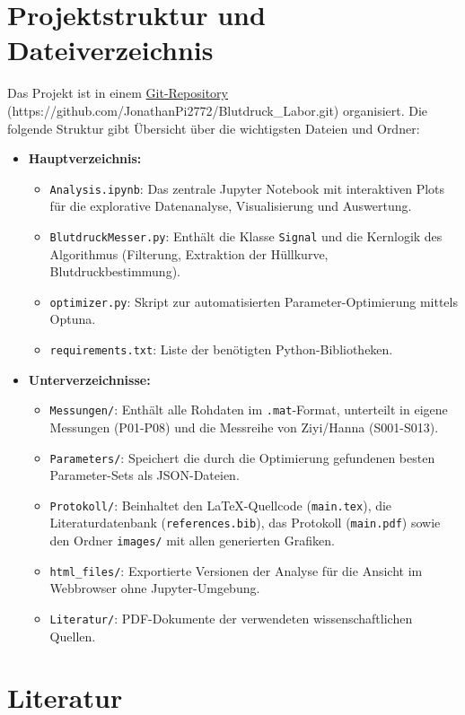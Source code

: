 \documentclass[a4paper, 11pt]{scrartcl}
\begin{document}
\newpage

\section{Projektstruktur und Dateiverzeichnis}

Das Projekt ist in einem \href{https://github.com/JonathanPi2772/Blutdruck_Labor.git}{Git-Repository} (https://github.com/JonathanPi2772/Blutdruck\_Labor.git) organisiert. Die folgende Struktur gibt Übersicht über die wichtigsten Dateien und Ordner:

\begin{itemize}
    \item \textbf{Hauptverzeichnis:}
    \begin{itemize}
        \item \texttt{Analysis.ipynb}: Das zentrale Jupyter Notebook mit interaktiven Plots für die explorative Datenanalyse, Visualisierung und Auswertung.
        \item \texttt{BlutdruckMesser.py}: Enthält die Klasse \texttt{Signal} und die Kernlogik des Algorithmus (Filterung, Extraktion der Hüllkurve, Blutdruckbestimmung).
        \item \texttt{optimizer.py}: Skript zur automatisierten Parameter-Optimierung mittels Optuna.
        \item \texttt{requirements.txt}: Liste der benötigten Python-Bibliotheken.
    \end{itemize}

    \item \textbf{Unterverzeichnisse:}
    \begin{itemize}
        \item \texttt{Messungen/}: Enthält alle Rohdaten im \texttt{.mat}-Format, unterteilt in eigene Messungen (P01-P08) und die Messreihe von Ziyi/Hanna (S001-S013).
        \item \texttt{Parameters/}: Speichert die durch die Optimierung gefundenen besten Parameter-Sets als JSON-Dateien.
        \item \texttt{Protokoll/}: Beinhaltet den LaTeX-Quellcode (\texttt{main.tex}), die Literaturdatenbank (\texttt{references.bib}), das Protokoll (\texttt{main.pdf}) sowie den Ordner \texttt{images/} mit allen generierten Grafiken.
        \item \texttt{html\_files/}: Exportierte Versionen der Analyse für die Ansicht im Webbrowser ohne Jupyter-Umgebung.
        \item \texttt{Literatur/}: PDF-Dokumente der verwendeten wissenschaftlichen Quellen.
    \end{itemize}
\end{itemize}

\newpage

\renewcommand\refname{}
\section{Literatur}
\printbibliography

\newpage

\end{document}
